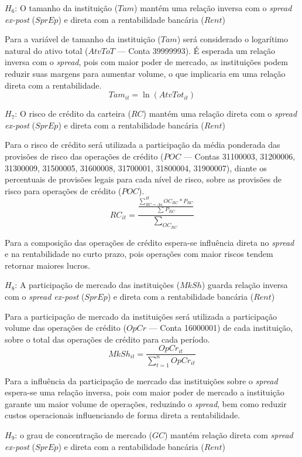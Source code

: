 \documentclass[12pt,12pt,openright,oneside,a4paper,chapter=TITLE,section=TITLE,subsection=TITLE,subsubsection=TITLE,english,french,spanish,portugues,sumario=tradicional]{abntex2}
\begin{document}
\(H_{6}\): O tamanho da instituição (\(Tam\)) mantém uma relação inversa com o \emph{spread ex-post} (\(SprEp\)) e direta com a rentabilidade bancária (\(Rent\))

Para a variável de tamanho da instituição (\(Tam\)) será considerado o logarítimo natural do ativo total (\(AtvToT\) --- Conta 39999993). É esperada um relação inversa com o \emph{spread}, pois com maior poder de mercado, as instituições podem reduzir suas margens para aumentar volume, o que implicaria em uma relação direta com a rentabilidade.
\[
Tam_{it} = \ln(AtvTot_{it})
\]

\(H_{7}\): O risco de crédito da carteira (\(RC\)) mantém uma relação direta com o \emph{spread ex-post} (\(SprEp\)) e direta com a rentabilidade bancária (\(Rent\))

Para o risco de crédito será utilizada a participação da média ponderada das provisões de risco das operações de crédito (\(POC\) --- Contas 31100003, 31200006, 31300009, 31500005, 31600008, 31700001, 31800004, 31900007), diante os percentuais de provisões legais para cada nível de risco, sobre as provisões de risco para operações de crédito (\(POC\)).
\[
RC_{it} = \frac{\frac{\sum_{RC = Aa}^HOC_{RC}*P_{RC}}{\sum_{}P_{RC}}}{\sum_{OC_{RC}}}
\]

Para a composição das operações de crédito espera-se influência direta no \emph{spread} e na rentabilidade no curto prazo, pois operações com maior riscos tendem retornar maiores lucros.

\(H_{8}\): A participação de mercado das instituições (\(MkSh\)) guarda relação inversa com o \emph{spread ex-post} (\(SprEp\)) e direta com a rentabilidade bancária (\(Rent\))

Para a participação de mercado da instituições será utilizada a participação volume das operações de crédito (\(OpCr\) --- Conta 16000001) de cada instituição, sobre o total das operações de crédito para cada período.
\[
MkSh_{it} = \frac{OpCr_{it}}{\sum_{t=1}^nOpCr_{it}}
\]

Para a influência da participação de mercado das instituições sobre o \emph{spread} espera-se uma relação inversa, pois com maior poder de mercado a instituição garante um maior volume de operações, reduzindo o \emph{spread}, bem como reduzir custos operacionais influenciando de forma direta a rentabilidade.

\(H_{9}\): o grau de concentração de mercado (\(GC\)) mantém relação direta com \emph{spread ex-post} (\(SprEp\)) e direta com a rentabilidade bancária (\(Rent\))
\end{document}
